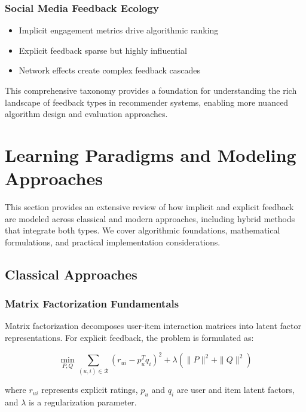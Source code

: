 \documentclass[acmsmall,review,anonymous]{acmart}
\begin{document}
\subsubsection{Social Media Feedback Ecology}
\begin{itemize}
    \item Implicit engagement metrics drive algorithmic ranking
    \item Explicit feedback sparse but highly influential
    \item Network effects create complex feedback cascades
\end{itemize}

This comprehensive taxonomy provides a foundation for understanding the rich landscape of feedback types in recommender systems, enabling more nuanced algorithm design and evaluation approaches.

\section{Learning Paradigms and Modeling Approaches}
\label{sec:learning}

This section provides an extensive review of how implicit and explicit feedback are modeled across classical and modern approaches, including hybrid methods that integrate both types. We cover algorithmic foundations, mathematical formulations, and practical implementation considerations.

\subsection{Classical Approaches}

\subsubsection{Matrix Factorization Fundamentals}

Matrix factorization decomposes user-item interaction matrices into latent factor representations. For explicit feedback, the problem is formulated as:

\begin{equation}
\min_{P,Q} \sum_{(u,i) \in \mathcal{R}} (r_{ui} - p_u^T q_i)^2 + \lambda (\|P\|^2 + \|Q\|^2)
\label{eq:explicit_mf}
\end{equation}

where $r_{ui}$ represents explicit ratings, $p_u$ and $q_i$ are user and item latent factors, and $\lambda$ is a regularization parameter.
\end{document}
